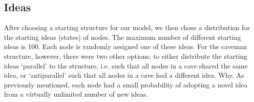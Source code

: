 \subsection{Ideas}


After choosing a starting structure for our model, we then chose a distribution for the starting ideas (states) of nodes. The maximum number of different starting ideas is 100. Each node is randomly assigned one of these ideas. For the caveman structure, however, there were two other options: to either distribute the starting ideas `parallel' to the structure, i.e. such that all nodes in a cave shared the same idea, or `antiparallel' such that all nodes in a cave had a different idea. Why. As previously mentioned, each node had a small probability of adopting a novel idea from a virtually unlimited number of new ideas.